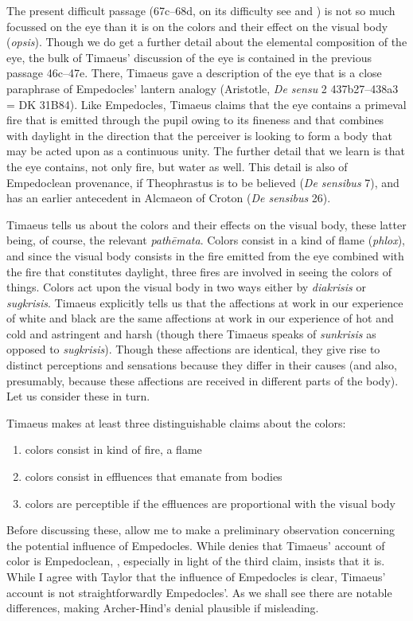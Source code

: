 The present difficult passage (67c--68d, on its difficulty see \citealt[479]{Taylor:1928qb} and \citealt[276]{Cornford:1935fk}) is not so much focussed on the eye than it is on the colors and their effect on the visual body (\emph{opsis}). Though we do get a further detail about the elemental composition of the eye, the bulk of Timaeus' discussion of the eye is contained in the previous passage 46c--47e. There, Timaeus gave a description of the eye that is a close paraphrase of Empedocles' lantern analogy (Aristotle, \emph{De sensu} 2 437b27--438a3 = DK 31B84). Like Empedocles, Timaeus claims that the eye contains a primeval fire that is emitted through the pupil owing to its fineness and that combines with daylight in the direction that the perceiver is looking to form a body that may be acted upon as a continuous unity. The further detail that we learn is that the eye contains, not only fire, but water as well. This detail is also of Empedoclean provenance, if Theophrastus is to be believed (\emph{De sensibus} 7), and has an earlier antecedent in Alcmaeon of Croton (\emph{De sensibus} 26). 

Timaeus tells us about the colors and their effects on the visual body, these latter being, of course, the relevant \emph{pathēmata}. Colors consist in a kind of flame (\emph{phlox}), and since the visual body consists in the fire emitted from the eye combined with the fire that constitutes daylight, three fires are involved in seeing the colors of things. Colors act upon the visual body in two ways either by \emph{diakrisis} or \emph{sugkrisis}. Timaeus explicitly tells us that the affections at work in our experience of white and black are the same affections at work in our experience of hot and cold and astringent and harsh (though there Timaeus speaks of \emph{sunkrisis} as opposed to \emph{sugkrisis}). Though these affections are identical, they give rise to distinct perceptions and sensations because they differ in their causes (and also, presumably, because these affections are received in different parts of the body). Let us consider these in turn.

Timaeus makes at least three distinguishable claims about the colors:
\begin{enumerate}
	\item colors consist in kind of fire, a flame
	\item colors consist in effluences that emanate from bodies
	\item colors are perceptible if the effluences are proportional with the visual body
\end{enumerate}
Before discussing these, allow me to make a preliminary observation concerning the potential influence of Empedocles. While \citet[248 n3]{Archer-Hind:1888qd} denies that Timaeus' account of color is Empedoclean, \citet[480]{Taylor:1928qb}, especially in light of the third claim, insists that it is. While I agree with Taylor that the influence of Empedocles is clear, Timaeus' account is not straightforwardly Empedocles'. As we shall see there are notable differences, making Archer-Hind's denial plausible if misleading.

